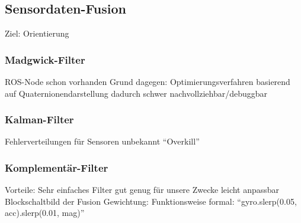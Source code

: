 
\subsection{Sensordaten-Fusion}
\label{headtracking_fusion_subsec}

Ziel: Orientierung


\subsubsection{Madgwick-Filter}

ROS-Node schon vorhanden
Grund dagegen: Optimierungsverfahren basierend auf Quaternionendarstellung dadurch schwer nachvollziehbar/debuggbar



\subsubsection{Kalman-Filter}

Fehlerverteilungen für Sensoren unbekannt
“Overkill”


\subsubsection{Komplementär-Filter}


Vorteile:
Sehr einfaches Filter
gut genug für unsere Zwecke
leicht anpassbar
Blockschaltbild der Fusion
Gewichtung: Funktionsweise formal: “gyro.slerp(0.05, acc).slerp(0.01, mag)”


